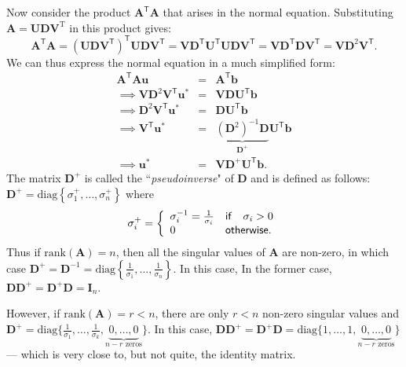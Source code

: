 Now consider the product $\mathbf{A}^\mathsf{T}\mathbf{A} $ that arises in the normal equation.  Substituting $\mathbf{A}= \mathbf{UDV}^\mathrm{T}$ in this product gives:
\[ 
\mathbf{A}^\mathsf{T}\mathbf{A} = ({\mathbf{UDV}^\mathsf{T}})^\mathsf{T}\mathbf{UDV}^\mathsf{T}=  \mathbf{VD}^\mathsf{T}\mathbf{U}^\mathsf{T}\mathbf{UDV}^\mathsf{T}
  = \mathbf{VD}^\mathsf{T}\mathbf{DV}^\mathsf{T} =  \mathbf{VD}^2\mathbf{V}^\mathsf{T}.
\]
We can thus express  the normal equation in a much simplified form:
\begin{eqnarray*}
\mathbf{A}^\mathsf{T}\mathbf{A}\mathbf{u}&=&\mathbf{A}^\mathsf{T}\mathbf{b}\\
\implies \mathbf{V}{\mathbf{D}^2\mathbf{V}^\mathsf{T}\mathbf{u}^\ast} &=& \mathbf{V}{\mathbf{D}\mathbf{U}^\mathsf{T}\mathbf{b}}\\
\implies \mathbf{D}^2\mathbf{V}^\mathsf{T}\mathbf{u}^\ast &=&   
\mathbf{D}\mathbf{U}^\mathsf{T}\mathbf{b} \\
\implies \mathbf{V}^\mathsf{T}\mathbf{u}^\ast &=&
\underbrace{\left(\mathbf{D}^2\right)^{-1}\mathbf{D}}_{\mathbf{D}^{+}}
\mathbf{U}^\mathsf{T}\mathbf{b}\\
\implies \mathbf{u}^\ast &=& \mathbf{V}\mathbf{D}^{+}\mathbf{U}^\mathsf{T}\mathbf{b}.
 \end{eqnarray*}
The matrix $\mathbf{D}^{+}$ is called the ``{\em pseudoinverse}" of $\mathbf{D}$ and is defined as follows:
$\mathbf{D}^{+}=\mathrm{diag}\left\{\sigma^{+}_1,\ldots,\sigma^{+}_n\right\}$ where
\[
\sigma^{+}_i =\left\{\begin{array}{lll}\sigma_i^{-1}=\frac{1}{\sigma_i}&\mathsf{if}& \sigma_i > 0\\
0 &\multicolumn{2}{l}{\textsf{otherwise.}}
\end{array}\right.
\]
Thus if $\mathrm{rank}(\mathbf{A}) = n$, then all the singular values of $\mathbf A$ are non-zero, in which case $\mathbf D^{+} = \mathbf D^{-1} = \mathrm{diag}\left\{\frac 1 {\sigma_1},\ldots,\frac 1 {\sigma_n} \right\}$.  In this case, In the former case, $\mathbf{DD}^+ = \mathbf D^+ \mathbf D = \mathbf I_n$.   

However, if $\mathrm{rank}(\mathbf{A}) = r < n$, there are only $r < n$ non-zero singular values and $\mathbf D^{+} = \mathrm{diag}\{\frac 1 {\sigma_1},\ldots,\frac 1 {\sigma_k}, \underbrace{0,\ldots,0}_{n-r \mbox{ zeros}}\}.$   In this case, $\mathbf{DD}^+ = \mathbf D^+ \mathbf D = \mathrm{diag}\{1,\ldots,1 , \underbrace{0,\ldots,0}_{n-r \mbox{ zeros}}\}$ --- which is very close to, but not quite, the identity matrix.



